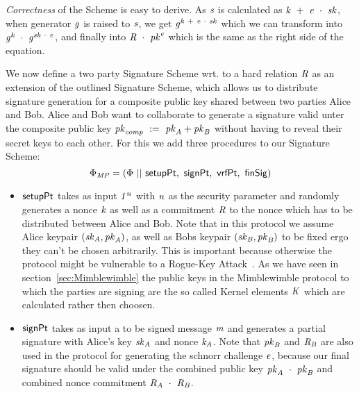\textit{Correctness} of the Scheme is easy to derive. As $\mathit{s}$ is calculated as $\mathit{k} ~+~ \mathit{e} ~\cdot~ \mathit{sk}$, when generator $\mathit{g}$ is raised to $\mathit{s}$, we get
$\mathit{g}^{\mathit{k} ~+~ \mathit{e} ~\cdot~ \mathit{sk}}$ which we can transform into $\mathit{g}^{\mathit{k}} ~\cdot~ \mathit{g}^{\mathit{sk} ~\cdot~ \mathit{e}}$, and finally
into $\mathit{R} ~\cdot~ \mathit{pk}^{\mathit{e}}$ which is the same as the right side of the equation.

\begin{definition}
    \label{def:twoPartySig}
    We now define a two party Signature Scheme wrt. to a hard relation $\mathit{R}$ as an extension of the outlined Signature Scheme,
    which allows us to distribute signature generation for a composite public key shared between two parties Alice and Bob. Alice and Bob want to collaborate to generate a signature valid unter the composite
    public key $\mathit{pk}_{\mathit{comp}} ~:=~ \mathit{pk}_{\mathit{A}} + \mathit{pk}_{\mathit{B}}$ without having to reveal their secret keys to each other. For this we add three procedures to our Signature Scheme:
    \[ \Phi_{\mathit{MP}} = (\Phi ~||~ \mathsf{setupPt} ,~ \mathsf{signPt} ,~ \mathsf{vrfPt} ,~ \mathsf{finSig}) \]
    \begin{itemize}
        \item $\mathsf{setupPt}$ takes as input $\mathit{1^n}$ with $\mathit{n}$ as the security parameter and randomly generates a nonce $\mathit{k}$ as well as a commitment $\mathit{R}$ to the nonce which has to be distributed between Alice and Bob. Note that in this protocol we assume Alice keypair $(\mathit{sk}_{\mathit{A}}, \mathit{pk}_{\mathit{A}})$, as well as Bobs keypair $(\mathit{sk}_{\mathit{B}}, \mathit{pk}_{\mathit{B}})$ to be fixed ergo they can't be chosen arbitrarily. This is important because otherwise the protocol might be vulnerable to a Rogue-Key Attack~\cite{horster1995meta}. As we have seen in section~\ref{sec:Mimblewimble} the public keys in the Mimblewimble protocol to which the parties are signing are the so called Kernel elements $\mathit{K}$ which are calculated rather then choosen.
        \item $\mathsf{signPt}$ takes as input a to be signed message $\mathit{m}$ and generates a partial signature with Alice's key $\mathit{sk}_{\mathit{A}}$ and nonce $\mathit{\mathit{k}_{\mathit{A}}}$. Note that $\mathit{pk}_{\mathit{B}}$ and $\mathit{R}_{\mathit{B}}$ are also used in the protocol for generating the schnorr challenge $\mathit{e}$, because our final signature should be valid under the combined public key $\mathit{pk}_{\mathit{A}} ~\cdot~ \mathit{pk}_{\mathit{B}}$ and combined nonce commitment $\mathit{R}_{\mathit{A}} ~\cdot~ \mathit{R}_{\mathit{B}}$.

\end{itemize}
\end{definition}

